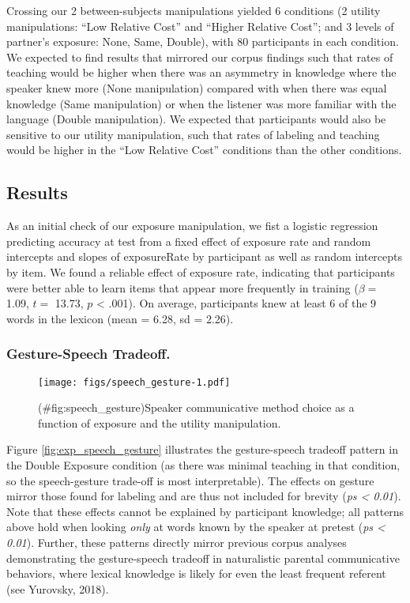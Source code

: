 \documentclass[english,,man,floatsintext]{apa6}
\begin{document}
Crossing our 2 between-subjects manipulations yielded 6 conditions (2 utility manipulations: \enquote{Low Relative Cost} and \enquote{Higher Relative Cost}; and 3 levels of partner's exposure: None, Same, Double), with 80 participants in each condition. We expected to find results that mirrored our corpus findings such that rates of teaching would be higher when there was an asymmetry in knowledge where the speaker knew more (None manipulation) compared with when there was equal knowledge (Same manipulation) or when the listener was more familiar with the language (Double manipulation). We expected that participants would also be sensitive to our utility manipulation, such that rates of labeling and teaching would be higher in the \enquote{Low Relative Cost} conditions than the other conditions.

\hypertarget{results-1}{%
\subsection{Results}\label{results-1}}

As an initial check of our exposure manipulation, we fist a logistic regression predicting accuracy at test from a fixed effect of exposure rate and random intercepts and slopes of exposureRate by participant as well as random intercepts by item. We found a reliable effect of exposure rate, indicating that participants were better able to learn items that appear more frequently in training (\(\beta =\) 1.09, \(t =\) 13.73, \(p\) \textless{} .001). On average, participants knew at least 6 of the 9 words in the lexicon (mean = 6.28, sd = 2.26).

\hypertarget{gesture-speech-tradeoff.}{%
\subsubsection{Gesture-Speech Tradeoff.}\label{gesture-speech-tradeoff.}}

\begin{figure}
\centering
\texttt{[image: figs/speech\_gesture-1.pdf]}
\caption{(\#fig:speech\_gesture)Speaker communicative method choice as a function of exposure and the utility manipulation.}
\end{figure}

Figure \ref{fig:exp_speech_gesture} illustrates the gesture-speech tradeoff pattern in the Double Exposure condition (as there was minimal teaching in that condition, so the speech-gesture trade-off is most interpretable). The effects on gesture mirror those found for labeling and are thus not included for brevity (\emph{ps \textless{} 0.01}). Note that these effects cannot be explained by participant knowledge; all patterns above hold when looking \emph{only} at words known by the speaker at pretest (\emph{ps \textless{} 0.01}). Further, these patterns directly mirror previous corpus analyses demonstrating the gesture-speech tradeoff in naturalistic parental communicative behaviors, where lexical knowledge is likely for even the least frequent referent (see Yurovsky, 2018).
\end{document}
